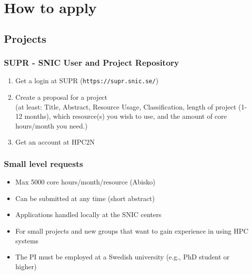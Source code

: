 %

\section{How to apply}

\subsection{Projects}

\begin{frame}[fragile]
	\frametitle{SUPR - SNIC User and Project Repository}
	\begin{enumerate}
		\item	Get a login at SUPR (\texttt{https://supr.snic.se/})
		\item	Create a proposal for a project \\
				{\small  (at least: Title, Abstract, Resource Usage, Classification, length of project (1-12 months), which resource(s) you wish to use, and the amount of core hours/month you need.)}
		\item	Get an account at HPC2N
	\end{enumerate}
  
\end{frame}

\begin{frame}
	\frametitle{Small level requests}
  
	\begin{itemize}
		\item	Max 5000 core hours/month/resource (Abisko)
		\item	Can be submitted at any time (short abstract)
		\item	Applications handled locally at the SNIC centers
		\item	For small projects and new groups that want to
				gain experience in using HPC systems
		\item	The PI must be employed at a Swedish university
				(e.g., PhD student or higher)
	\end{itemize}

\end{frame}


